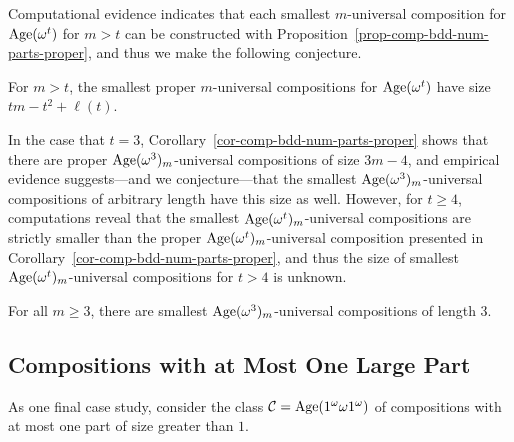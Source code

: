 Computational evidence indicates that each smallest $m$-universal composition for $\operatorname{Age}(\omega^t)$ for $m > t$ can be constructed with Proposition~\ref{prop-comp-bdd-num-parts-proper}, and thus we make the following conjecture.
\begin{conjecture}
\label{conj-comp-bdd-num-parts-proper}
	For $m > t$, the smallest proper $m$-universal compositions for $\operatorname{Age}(\omega^t)$ have size $tm - t^2 + \ell(t)$.
\end{conjecture}

In the case that $t = 3$, Corollary~\ref{cor-comp-bdd-num-parts-proper} shows that there are proper $\operatorname{Age}(\omega^3)_m$-universal compositions of size $3m-4$, and empirical evidence suggests---and we conjecture---that the smallest $\operatorname{Age}(\omega^3)_m$-universal compositions of arbitrary length have this size as well. However, for $t \ge 4$, computations reveal that the smallest $\operatorname{Age}(\omega^t)_m$-universal compositions are strictly smaller than the proper $\operatorname{Age}(\omega^t)_m$-universal composition presented in Corollary~\ref{cor-comp-bdd-num-parts-proper}, and thus the size of smallest $\operatorname{Age}(\omega^t)_m$-universal compositions for $t > 4$ is unknown.

\begin{conjecture}
\label{conj-comp-length-3-improper}
	For all $m \ge 3$, there are smallest $\operatorname{Age}(\omega^3)_m$-universal compositions of length $3$.
\end{conjecture}

\subsection{Compositions with at Most One Large Part}
\label{subsec-comp-one-large-part}

As one final case study, consider the class $\mathcal{C} = \operatorname{Age}(1^\omega \omega 1^\omega)$ of compositions with at most one part of size greater than $1$.

